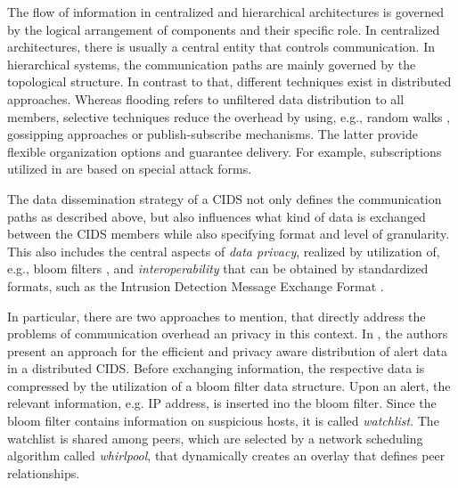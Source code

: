 
The flow of information in centralized and hierarchical architectures is governed by the logical arrangement of components and their specific role. In centralized architectures, there is usually a central entity that controls communication. In hierarchical systems, the communication paths are mainly governed by the topological structure. In contrast to that, different techniques exist in distributed approaches. Whereas flooding refers to unfiltered data distribution to all members, selective techniques reduce the overhead by using, e.g., random walks \cite{Vishnumurthy2006}, gossipping approaches \cite{Dash2006}\cite{Ganesh2003} or publish-subscribe mechanisms. The latter provide flexible organization options and guarantee delivery. For example, subscriptions utilized in \cite{Janakiraman2003} are based on special attack forms.

The data dissemination strategy of a CIDS not only defines the communication paths as described above, but also influences what kind of data is exchanged between the CIDS members while also specifying format and level of granularity. This also includes the central aspects of \textit{data privacy}, realized by utilization of, e.g., bloom filters \cite{Vasilomanolakis2015SkipMon}\cite{Locasto2005}, and \textit{interoperability} that can be obtained by standardized formats, such as the Intrusion Detection Message Exchange Format \cite{Cuppens2002}\cite{Duma2006}.

In particular, there are two approaches to mention, that directly address the problems of communication overhead an privacy in this context. In \cite{Locasto2005}, the authors present an approach for the efficient and privacy aware distribution of alert data in a distributed CIDS. Before exchanging information, the respective data is compressed by the utilization of a bloom filter data structure. Upon an alert, the relevant information, e.g. IP address, is inserted ino the bloom filter. Since the bloom filter contains information on suspicious hosts, it is called \textit{watchlist}. The watchlist is shared among peers, which are selected by a network scheduling algorithm called \textit{whirlpool}, that dynamically creates an overlay that defines peer relationships.


